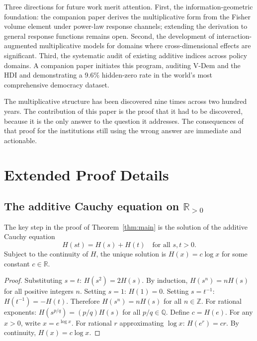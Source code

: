 \documentclass[12pt, a4paper]{article}
\theoremstyle{definition}
\theoremstyle{remark}
\newcommand{\R}{\mathbb{R}}
\newcommand{\Rp}{\mathbb{R}_{>0}}
\begin{document}
Three directions for future work merit attention. First, the information-geometric foundation: the companion paper \cite{kirsch2026ig} derives the multiplicative form from the Fisher volume element under power-law response channels; extending the derivation to general response functions remains open. Second, the development of interaction-augmented multiplicative models for domains where cross-dimensional effects are significant. Third, the systematic audit of existing additive indices across policy domains. A companion paper \cite{kirsch2026audit} initiates this program, auditing V-Dem and the HDI and demonstrating a 9.6\% hidden-zero rate in the world's most comprehensive democracy dataset.

The multiplicative structure has been discovered nine times across two hundred years. The contribution of this paper is the proof that it had to be discovered, because it is the only answer to the question it addresses. The consequences of that proof for the institutions still using the wrong answer are immediate and actionable.


\appendix

\section{Extended Proof Details}\label{app:proof}

\subsection{The additive Cauchy equation on $\Rp$}

The key step in the proof of Theorem~\ref{thm:main} is the solution of the additive Cauchy equation
\begin{equation}\label{eq:addcauchy}
H(st) = H(s) + H(t) \quad \text{for all } s, t > 0.
\end{equation}
Subject to the continuity of $H$, the unique solution is $H(x) = c \log x$ for some constant $c \in \R$.

\begin{proof}
Substituting $s = t$: $H(s^2) = 2H(s)$. By induction, $H(s^n) = nH(s)$ for all positive integers $n$. Setting $s = 1$: $H(1) = 0$. Setting $s = t^{-1}$: $H(t^{-1}) = -H(t)$. Therefore $H(s^n) = nH(s)$ for all $n \in \mathbb{Z}$. For rational exponents: $H(s^{p/q}) = (p/q)H(s)$ for all $p/q \in \mathbb{Q}$. Define $c = H(e)$. For any $x > 0$, write $x = e^{\log x}$. For rational $r$ approximating $\log x$: $H(e^r) = cr$. By continuity, $H(x) = c \log x$.
\end{proof}
\end{document}
